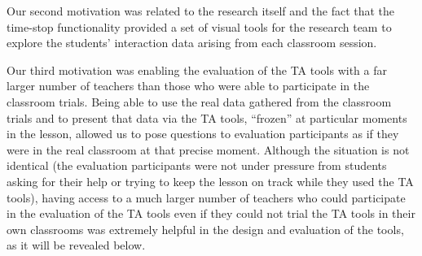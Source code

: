 Our second motivation was related to the research itself and the fact
that the time-stop functionality provided a set of visual tools for
the research team to explore the students’ interaction data arising
from each classroom session.

Our third motivation was enabling the evaluation of the TA tools with
a far larger number of teachers than those who were able to
participate in the classroom trials. Being able to use the real data
gathered from the classroom trials and to present that data via the TA
tools, “frozen” at particular moments in the lesson, allowed us to
pose questions to evaluation participants as if they were in the real
classroom at that precise moment. Although the situation is not
identical (the evaluation participants were not under pressure from
students asking for their help or trying to keep the lesson on track
while they used the TA tools), having access to a much larger number
of teachers who could participate in the evaluation of the TA tools
even if they could not trial the TA tools in their own classrooms was
extremely helpful in the design and evaluation of the tools, as it
will be revealed below.
